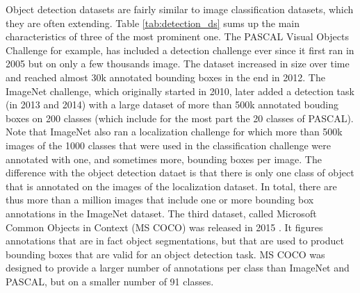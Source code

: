 Object detection datasets are fairly similar to image classification datasets, which they are often extending. Table \ref{tab:detection_ds} sums up the main characteristics of three of the most prominent one. The PASCAL Visual Objects Challenge \cite{Everingham10} for example, has included a detection challenge ever since it first ran in 2005 but on only a few thousands image. The dataset increased in size over time and reached almost 30k annotated bounding boxes in the end in 2012. The ImageNet challenge, which originally started in 2010, later added a detection task (in 2013 and 2014) with a large dataset of more than 500k annotated bouding boxes on 200 classes (which include for the most part the 20 classes of PASCAL). Note that ImageNet also ran a localization challenge for which more than 500k images of the 1000 classes that were used in the classification challenge were annotated with one, and sometimes more, bounding boxes per image. The difference with the object detection dataet is that there is only one class of object that is annotated on the images of the localization dataset. In total, there are thus more than a million images that include one or more bounding box annotations in the ImageNet dataset. The third dataset, called Microsoft Common Objects in Context (MS COCO) was released in 2015 \cite{chen2015microsoft}. It figures annotations that are in fact object segmentations, but that are used to product bounding boxes that are valid for an object detection task. MS COCO was designed to provide a larger number of annotations per class than ImageNet and PASCAL, but on a smaller number of 91 classes. 

